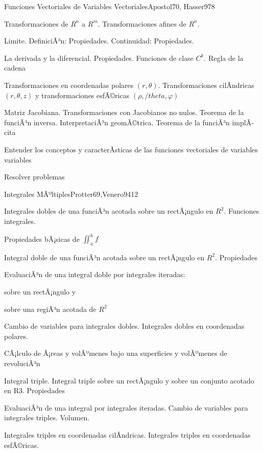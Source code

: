 \begin{syllabus}
\begin{unit}{Funciones Vectoriales de Variables Vectoriales}{Apostol70, Hasser97}{8}
   \begin{topics}
         \item  Transformaciones de $R^n$ a $R^m$. Transformaciones afines de $R^n$.
	 \item  Limite. DefiniciÃ³n: Propiedades. Continuidad: Propiedades.
         \item  La derivada y la diferencial. Propiedades. Funciones de clase $C^k$. Regla de la cadena
	 \item  Transformaciones en coordenadas polares $(r,\theta)$. Transformaciones cilÃ­ndricas  $(r,\theta,z)$ y transformaciones esfÃ©ricas $(\rho,/theta,\varphi)$
         \item  Matriz Jacobiana. Transformaciones con Jacobianos no nulos. Teorema de la funciÃ³n inversa. InterpretaciÃ³n geomÃ©trica. Teorema de la funciÃ³n implÃ­cita
   \end{topics}

   \begin{unitgoals}
         \item  Entender los conceptos y caracterÃ­sticas de las funciones vectoriales de variables variables
         \item  Resolver problemas
   \end{unitgoals}
\end{unit}

\begin{unit}{Integrales MÃºltiples}{Protter69,Venero94}{12}
   \begin{topics}
         \item  Integrales dobles de una funciÃ³n acotada sobre un rectÃ¡ngulo en $R^2$. Funciones integrales.
	 \item  Propiedades bÃ¡sicas de $\iint_{a}^{b} f$
         \item  Integral doble de una funciÃ³n acotada sobre un rectÃ¡ngulo en $R^2$. Propiedades
	 \item  EvaluaciÃ³n de una integral doble por integrales iteradas:
	\begin{subtopicos}
		\item sobre un rectÃ¡ngulo y
		\item sobre una regiÃ³n acotada de $R^2$
	\end{subtopicos}
         \item  Cambio de variables para integrales dobles. Integrales dobles en coordenadas polares.
	 \item  CÃ¡lculo de Ã¡reas y volÃºmenes bajo una superficies y volÃºmenes de revoluciÃ³n
         \item  Integral triple. Integral triple sobre un rectÃ¡ngulo y sobre un conjunto acotado en R3. Propiedades
	\item EvaluaciÃ³n de una integral por integrales iteradas. Cambio de variables para integrales triples. Volumen.
	\item Integrales triples en coordenadas cilÃ­ndricas. Integrales triples en coordenadas esfÃ©ricas.
   \end{topics}


\end{unit}
\end{syllabus}
